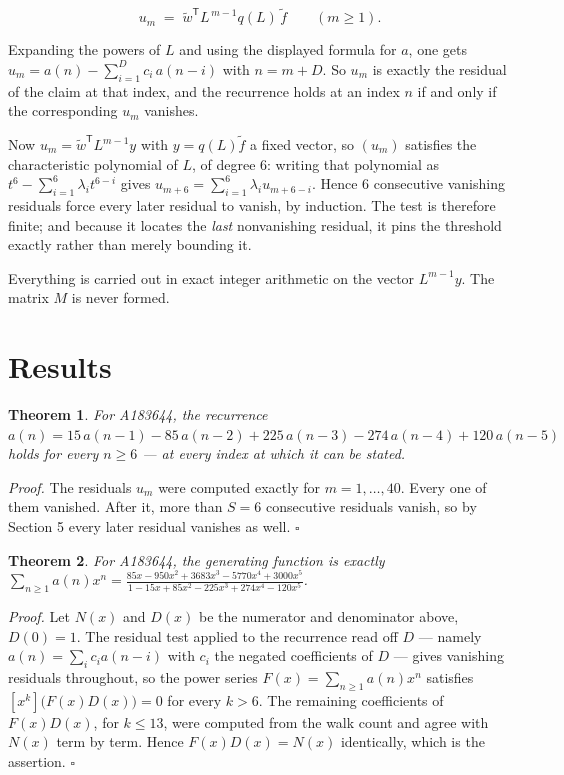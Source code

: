 \documentclass[11pt]{article}
\newtheorem{theorem}{Theorem}
\theoremstyle{definition}
\begin{document}
\[u_m \;=\; \tilde w^{\mathsf T} L^{\,m-1} q(L)\,\tilde f \qquad (m \ge 1).\]

Expanding the powers of $L$ and using the displayed formula for $a$, one gets $u_m = a(n) - \sum_{i=1}^{D} c_i\,a(n-i)$ with $n = m + D$. So $u_m$ is exactly the residual of the claim at that index, and the recurrence holds at an index $n$ if and only if the corresponding $u_m$ vanishes.

Now $u_m = \tilde w^{\mathsf T} L^{m-1} y$ with $y = q(L)\tilde f$ a fixed vector, so $(u_m)$ satisfies the characteristic polynomial of $L$, of degree $6$: writing that polynomial as $t^{6} - \sum_{i=1}^{6} \lambda_i t^{6-i}$ gives $u_{m+6} = \sum_{i=1}^{6} \lambda_i u_{m+6-i}$. Hence $6$ consecutive vanishing residuals force every later residual to vanish, by induction. The test is therefore finite; and because it locates the {\itshape last} nonvanishing residual, it pins the threshold exactly rather than merely bounding it.

Everything is carried out in exact integer arithmetic on the vector $L^{m-1}y$. The matrix $M$ is never formed.

\section{Results}

\begin{theorem} For A183644, the recurrence $a(n) = 15\,a(n-1) - 85\,a(n-2) + 225\,a(n-3) - 274\,a(n-4) + 120\,a(n-5)$ holds for every $n \ge 6$ --- at every index at which it can be stated.\end{theorem}

{\itshape Proof.} The residuals $u_m$ were computed exactly for $m = 1,\dots,40$. Every one of them vanished. After it, more than $S = 6$ consecutive residuals vanish, so by Section 5 every later residual vanishes as well. $\square$

\begin{theorem} For A183644, the generating function is exactly $\sum_{n\ge 1} a(n)x^n = \frac{85x - 950x^{2} + 3683x^{3} - 5770x^{4} + 3000x^{5}}{1 - 15x + 85x^{2} - 225x^{3} + 274x^{4} - 120x^{5}}$.\end{theorem}

{\itshape Proof.} Let $N(x)$ and $D(x)$ be the numerator and denominator above, $D(0)=1$. The residual test applied to the recurrence read off $D$ --- namely $a(n) = \sum_i c_i a(n-i)$ with $c_i$ the negated coefficients of $D$ --- gives vanishing residuals throughout, so the power series $F(x)=\sum_{n\ge 1}a(n)x^n$ satisfies $[x^k]\bigl(F(x)D(x)\bigr) = 0$ for every $k > 6$. The remaining coefficients of $F(x)D(x)$, for $k \le 13$, were computed from the walk count and agree with $N(x)$ term by term. Hence $F(x)D(x) = N(x)$ identically, which is the assertion. $\square$
\end{document}
